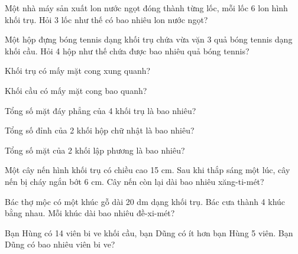 \begin{ex}
Một nhà máy sản xuất lon nước ngọt đóng thành từng lốc, mỗi lốc 6 lon hình khối trụ. Hỏi 3 lốc như thế có bao nhiêu lon nước ngọt?
\end{ex}

\begin{ex}
Một hộp đựng bóng tennis dạng khối trụ chứa vừa vặn 3 quả bóng tennis dạng khối cầu. Hỏi 4 hộp như thế chứa được bao nhiêu quả bóng tennis?
\end{ex}

\begin{ex}
Khối trụ có mấy mặt cong xung quanh?
\end{ex}

\begin{ex}
Khối cầu có mấy mặt cong bao quanh?
\end{ex}

\begin{ex}
Tổng số mặt đáy phẳng của 4 khối trụ là bao nhiêu?
\end{ex}

\begin{ex}
Tổng số đỉnh của 2 khối hộp chữ nhật là bao nhiêu?
\end{ex}

\begin{ex}
Tổng số mặt của 2 khối lập phương là bao nhiêu?
\end{ex}

\begin{ex}
Một cây nến hình khối trụ có chiều cao 15 cm. Sau khi thắp sáng một lúc, cây nến bị cháy ngắn bớt 6 cm. Cây nến còn lại dài bao nhiêu xăng-ti-mét?
\end{ex}

\begin{ex}
Bác thợ mộc có một khúc gỗ dài 20 dm dạng khối trụ. Bác cưa thành 4 khúc bằng nhau. Mỗi khúc dài bao nhiêu đề-xi-mét?
\end{ex}

\begin{ex}
Bạn Hùng có 14 viên bi ve khối cầu, bạn Dũng có ít hơn bạn Hùng 5 viên. Bạn Dũng có bao nhiêu viên bi ve?
\end{ex}

